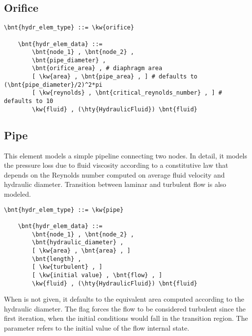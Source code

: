 \subsection{Orifice}
\label{sec:EL:HYDR:ORIFICE}
\begin{Verbatim}[commandchars=\\\{\}]
    \bnt{hydr_elem_type} ::= \kw{orifice}

    \bnt{hydr_elem_data} ::=
        \bnt{node_1} , \bnt{node_2} ,
        \bnt{pipe_diameter} ,
        \bnt{orifice_area} , # diaphragm area
        [ \kw{area} , \bnt{pipe_area} , ] # defaults to (\bnt{pipe_diameter}/2)^2*pi
        [ \kw{reynolds} , \bnt{critical_reynolds_number} , ] # defaults to 10
        \kw{fluid} , (\hty{HydraulicFluid}) \bnt{fluid}
\end{Verbatim}



\subsection{Pipe}
\label{sec:EL:HYDR:PIPE}
This element models a simple pipeline connecting two  nodes.
In detail, it models the pressure loss due to fluid viscosity
according to a constitutive law that depends on the Reynolds number
computed on average fluid velocity and hydraulic diameter.
Transition between laminar and turbulent flow is also modeled.
\begin{Verbatim}[commandchars=\\\{\}]
    \bnt{hydr_elem_type} ::= \kw{pipe}

    \bnt{hydr_elem_data} ::=
        \bnt{node_1} , \bnt{node_2} ,
        \bnt{hydraulic_diameter} ,
        [ \kw{area} , \bnt{area} , ]
        \bnt{length} ,
        [ \kw{turbulent} , ]
        [ \kw{initial value} , \bnt{flow} , ]
        \kw{fluid} , (\hty{HydraulicFluid}) \bnt{fluid}
\end{Verbatim}
When  is not given, it defaults to the equivalent area
computed according to the hydraulic diameter.
The flag  forces the flow to be considered turbulent
since the first iteration, when the initial conditions would fall
in the transition region.
The  parameter refers to the initial value
of the flow internal state.


